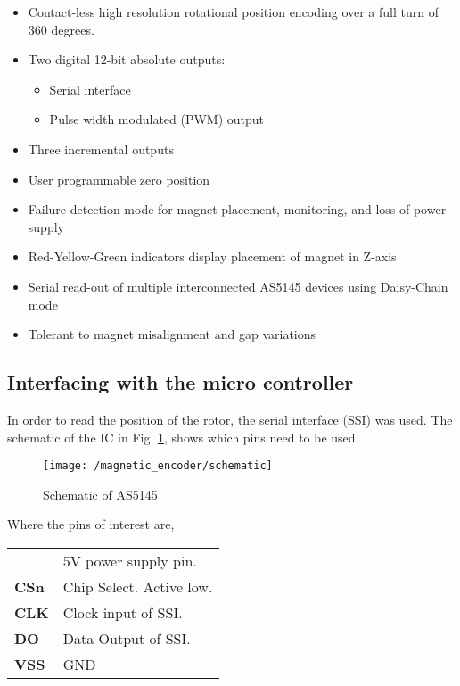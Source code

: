 \begin{itemize}
	\item Contact-less high resolution rotational position encoding over a full turn of 360 degrees.
	\item Two digital 12-bit absolute outputs:
	\begin{itemize}
		\item Serial interface
		\item Pulse width modulated (PWM) output
	\end{itemize}
	\item Three incremental outputs
	\item User programmable zero position
	\item Failure detection mode for magnet placement, monitoring, and loss of power supply
	\item Red-Yellow-Green indicators display placement of magnet in Z-axis
	\item Serial read-out of multiple interconnected AS5145 devices using Daisy-Chain mode
	\item Tolerant to magnet misalignment and gap variations
\end{itemize}

\subsection{Interfacing with the micro controller}

In order to read the position of the rotor, the serial interface (SSI) was used. The schematic of the IC in Fig. \ref{Fig:Schematic AS5145}, shows which pins need to be used.

\begin{figure}	\label{Fig:Schematic AS5145}
	\begin{center}
		\texttt{[image: /magnetic\_encoder/schematic]}
		\caption{Schematic of AS5145}
	\end{center}
\end{figure}

\noindent Where the pins of interest are,

\begin{center}
	\begin{tabular}{|l l|}
	\hline \boldmath{$VDD5V$} 	& 5V power supply pin.\\
	\textbf{CSn}			& Chip Select. Active low.\\
	\textbf{CLK}			& Clock input of SSI.\\
	\textbf{DO}			& Data Output of SSI.\\	
	\textbf{VSS}			& GND	\\	\hline
	\end{tabular}
\end{center}


